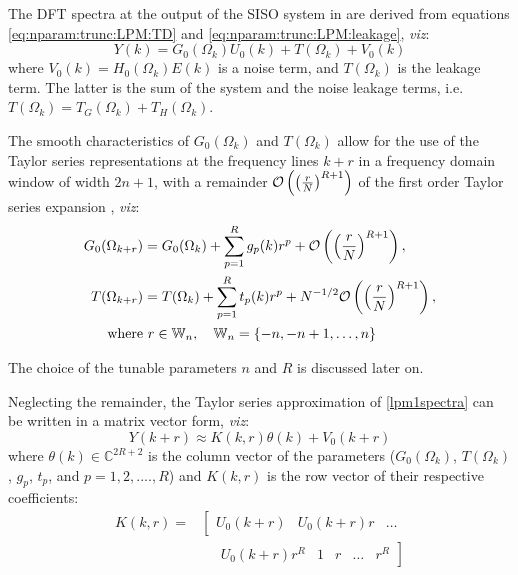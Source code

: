 The \gls{DFT} spectra at the output of the \gls{SISO} system in  are derived from equations \eqref{eq:nparam:trunc:LPM:TD} and \eqref{eq:nparam:trunc:LPM:leakage}, \emph{viz}:
\begin{equation}\label{lpm1spectra}
Y(k)=G_0(\Omega_k)U_0(k)+T(\Omega_k)+V_0(k)
\end{equation}
where $V_0(k) = H_0(\Omega_k)E(k)$ is a noise term, and $T(\Omega_k)$ is the leakage term. The latter is the sum of the system and the noise leakage terms, i.e. $T(\Omega_k) = T_G(\Omega_k) + T_H(\Omega_k)$.

The smooth characteristics of $G_0(\Omega_k)$ and $T(\Omega_k)$ allow for the use of the Taylor series representations at the frequency lines $k+r$ in a frequency domain window of width $2n+1$, with a remainder $\mathcal{O} \left( \left(\frac{r}{N}\right)^{R+1} \right)$ of the first order Taylor series expansion \citep{Schoukens2009LPM}, \emph{viz}:
\begin{align}\label{lpmGTaylorS}
G_0(\Omega_{k+r})&=G_0(\Omega_k)+\sum_{p=1}^{R}g_p(k)r^p+
\mathcal{O} \left( \left(\frac{r}{N}\right)^{R+1} \right),
\\
\label{lpmTTaylorS}
T(\Omega_{k+r})&=T(\Omega_k)+\sum_{p=1}^{R}t_p(k)r^p+N^{-1/2}
\mathcal{O} \left(   \left(\frac{r}{N}\right)^{R+1}   \right)
,
\\
\text{where}&\ r\in\mathbb{W}_n,\quad \mathbb{W}_n = \{-n,-n+1,\dots,n\}
\end{align}

The choice of the tunable parameters $n$ and $R$ is discussed later on.

Neglecting the remainder, the Taylor series approximation of \eqref{lpm1spectra} can be written in a matrix vector form, \emph{viz}:
\begin{equation}\label{lpmGTMatrix}
Y(k+r)\approx{K(k, r)\theta(k)+V_0(k+r)}
\end{equation}
where $\theta(k)\in\mathbb{C}^{2R+2}$ is the column vector of the  parameters ($G_0(\Omega_k)$, $T(\Omega_k)$, $g_p$, $t_p$, and $p = 1, 2, ...., R$) and $K(k, r)$ is the row vector of their respective coefficients:
\begin{align}
K(k,r) = &\left[
\begin{matrix}
U_0(k+r) & U_0(k+r)r & \dots
\end{matrix}
\right.
\\
&\quad\left.\begin{matrix}U_0(k+r)r^R & 1& r&\dots&r^R\end{matrix}\right]\nonumber
\end{align}


